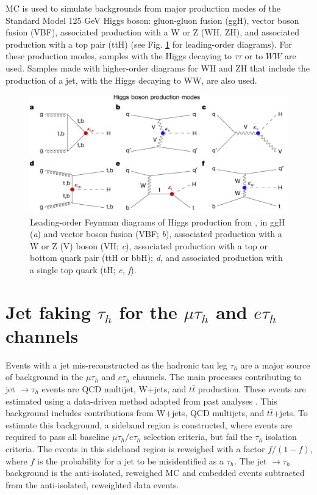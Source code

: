 MC is used to simulate backgrounds from major production modes of the Standard Model 125 GeV Higgs boson: gluon-gluon fusion (ggH), vector boson fusion (VBF), associated production with a W or Z (WH, ZH), and associated production with a top pair (ttH) (see Fig. \ref{fig:higgs-boson-production-modes} for leading-order diagrams). For these production modes, samples with the Higgs decaying to $\tau\tau$ or to $WW$ are used. Samples made with higher-order diagrams for WH and ZH that include the production of a jet, with the Higgs decaying to WW, are also used.

\begin{figure}[ht]
    \centering
    \includegraphics[width=15cm]{figures/ch-9-background-estimation/higgs-boson-production-modes.png}
    \caption[Leading-order Feynman diagrams of Higgs production.]{Leading-order Feynman diagrams of Higgs production from \cite{CMS-HIG-22-001}, in ggH (\textit{a}) and vector boson fusion (VBF; \textit{b}), associated production with a W or Z (V) boson (VH; \textit{c}), associated production with a top or bottom quark pair (ttH or bbH); \textit{d}, and associated production with a single top quark (tH; \textit{e, f}).} 

     \label{fig:higgs-boson-production-modes}
\end{figure}

\section{Jet faking $\tau_{h}$ for the $\mu\tau_{h}$ and $e\tau_{h}$ channels}
Events with a jet mis-reconstructed as the hadronic tau leg $\tau_{h}$ are a major source of background in the $\mu\tau_{h}$ and $e\tau_{h}$ channels. The main processes contributing to jet $\rightarrow \tau_{h}$ events are QCD multijet, W+jets, and $t\bar{t}$ production. These events are estimated using a data-driven method adapted from past analyses \cite{CMS-HIG-19-010} \cite{CMS-HIG-17-024}. This background includes contributions from W+jets, QCD multijets, and $t\bar{t}$+jets. To estimate this background, a sideband region is constructed, where events are required to pass all baseline $\mu\tau_{h}/ e\tau_{h}$ selection criteria, but fail the $\tau_{h}$ isolation criteria. The events in this sideband region is reweighed with a factor $f/(1-f)$, where $f$ is the probability for a jet to be misidentified as a $\tau_{h}$. The jet $\rightarrow \tau_{h}$ background is the anti-isolated, reweighed MC and embedded events subtracted from the anti-isolated, reweighted data events.

